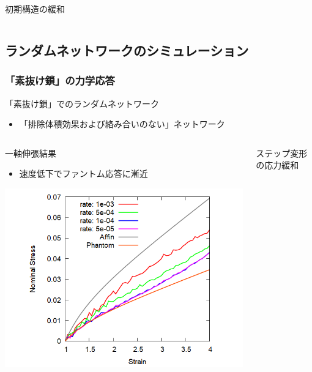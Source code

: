 \documentclass[aspectratio=169,11pt, dvipdfmx]{beamer}
\begin{document}
\begin{frame}
\begin{exampleblock}{初期構造の緩和}
\begin{columns}[T, onlytextwidth]
		\end{columns}
    \end{exampleblock}
\end{frame}

\subsection{ランダムネットワークのシミュレーション}
\begin{frame}
	\frametitle{「素抜け鎖」の力学応答}
		\begin{alertblock}{「素抜け鎖」でのランダムネットワーク}
			\begin{itemize}
				\item \alert{「排除体積効果および絡み合いのない」}ネットワーク
			\end{itemize}
        \end{alertblock}
        \vspace{-3mm}
		\begin{columns}[totalwidth=\linewidth]
				\begin{block}{一軸伸張結果}
					\begin{itemize}
						\item 速度低下で\alert{ファントム応答}に漸近
                    \end{itemize}
                    \centering
                        \includegraphics[width=.78\columnwidth]{N48_sunuke.png}
				\end{block}
				\begin{exampleblock}{ステップ変形の応力緩和}
                    \begin{itemize}

\end{itemize}
\end{exampleblock}
\end{columns}
\end{frame}
\end{document}
